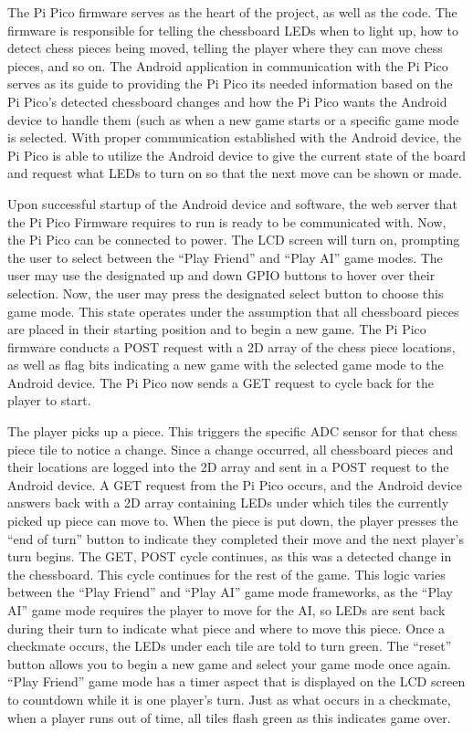 \documentclass[11pt,journal]{IEEEtran}
\begin{document}
The Pi Pico firmware serves as the heart of the project, as well as the code. The firmware is responsible for telling the chessboard LEDs when to light up, how to detect chess pieces being moved, telling the player where they can move chess pieces, and so on. The Android application in communication with the Pi Pico serves as its guide to providing the Pi Pico its needed information based on the Pi Pico's detected chessboard changes and how the Pi Pico wants the Android device to handle them (such as when a new game starts or a specific game mode is selected. With proper communication established with the Android device, the Pi Pico is able to utilize the Android device to give the current state of the board and request what LEDs to turn on so that the next move can be shown or made.

Upon successful startup of the Android device and software, the web server that the Pi Pico Firmware requires to run is ready to be communicated with. Now, the Pi Pico can be connected to power. The LCD screen will turn on, prompting the user to select between the ``Play Friend'' and ``Play AI'' game modes. The user may use the designated up and down GPIO buttons to hover over their selection. Now, the user may press the designated select button to choose this game mode. This state operates under the assumption that all chessboard pieces are placed in their starting position and to begin a new game. The Pi Pico firmware conducts a POST request with a 2D array of the chess piece locations, as well as flag bits indicating a new game with the selected game mode to the Android device. The Pi Pico now sends a GET request to cycle back for the player to start.

The player picks up a piece. This triggers the specific ADC sensor for that chess piece tile to notice a change. Since a change occurred, all chessboard pieces and their locations are logged into the 2D array and sent in a POST request to the Android device. A GET request from the Pi Pico occurs, and the Android device answers back with a 2D array containing LEDs under which tiles the currently picked up piece can move to. When the piece is put down, the player presses the ``end of turn'' button to indicate they completed their move and the next player's turn begins. The GET, POST cycle continues, as this was a detected change in the chessboard. This cycle continues for the rest of the game. This logic varies between the ``Play Friend'' and ``Play AI'' game mode frameworks, as the ``Play AI'' game mode requires the player to move for the AI, so LEDs are sent back during their turn to indicate what piece and where to move this piece. Once a checkmate occurs, the LEDs under each tile are told to turn green. The ``reset'' button allows you to begin a new game and select your game mode once again. ``Play Friend'' game mode has a timer aspect that is displayed on the LCD screen to countdown while it is one player's turn. Just as what occurs in a checkmate, when a player runs out of time, all tiles flash green as this indicates game over.
\end{document}
